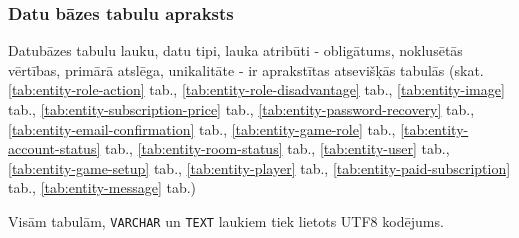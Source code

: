 \subsubsection{Datu bāzes tabulu apraksts}
Datubāzes tabulu lauku, datu tipi, lauka atribūti - obligātums, noklusētās vērtības, primārā atslēga,
unikalitāte - ir aprakstītas atsevišķās tabulās (skat.
\ref{tab:entity-role-action} tab.,
\ref{tab:entity-role-disadvantage} tab.,
\ref{tab:entity-image} tab.,
\ref{tab:entity-subscription-price} tab.,
\ref{tab:entity-password-recovery} tab.,
\ref{tab:entity-email-confirmation} tab.,
\ref{tab:entity-game-role} tab.,
\ref{tab:entity-account-status} tab.,
\ref{tab:entity-room-status} tab.,
\ref{tab:entity-user} tab.,
\ref{tab:entity-game-setup} tab.,
\ref{tab:entity-player} tab.,
\ref{tab:entity-paid-subscription} tab.,
\ref{tab:entity-message} tab.)

Visām tabulām, \texttt{VARCHAR} un \texttt{TEXT} laukiem tiek lietots UTF8 kodējums.


















